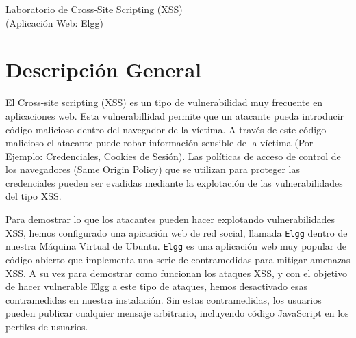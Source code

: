 
\newcommand{\commonfolder}{../../common-files}
\newcommand{\webcommon}{../Web_Common}









\begin{center}
{\LARGE Laboratorio de Cross-Site Scripting (XSS)}
\vspace{0.1in}\\
{\Large (Aplicación Web: Elgg)}
\end{center}


\section{Descripción General}

El Cross-site scripting (XSS) es un tipo de vulnerabilidad muy frecuente en aplicaciones web. Esta vulnerabillidad permite que un atacante pueda introducir código malicioso dentro del navegador de la víctima. A través de este código malicioso el atacante puede robar información sensible de la víctima (Por Ejemplo: Credenciales, Cookies de Sesión). Las políticas de acceso de control de los navegadores (Same Origin Policy) que se utilizan para proteger las credenciales pueden ser evadidas mediante la explotación de las vulnerabilidades del tipo XSS.

Para demostrar lo que los atacantes pueden hacer explotando vulnerabilidades XSS, hemos configurado una apicación web de red social, llamada {\tt Elgg} dentro de nuestra Máquina Virtual de Ubuntu.
{\tt Elgg} es una aplicación web muy popular de código abierto que implementa una serie de contramedidas para mitigar amenazas XSS. A su vez para demostrar como funcionan los ataques XSS, y con el objetivo de hacer vulnerable Elgg a este tipo de ataques, hemos desactivado esas contramedidas en nuestra instalación.
Sin estas contramedidas, los usuarios pueden publicar cualquier mensaje arbitrario, incluyendo código JavaScript en los perfiles de usuarios.

